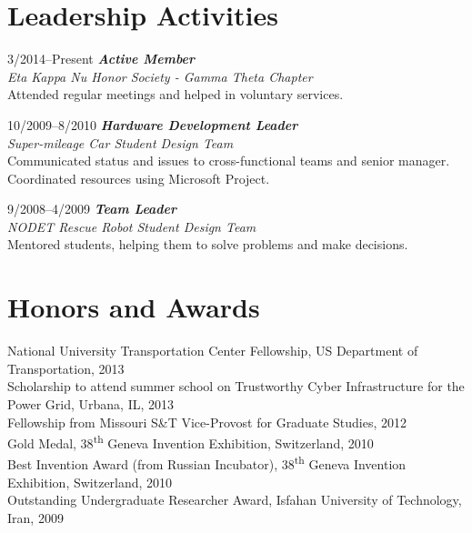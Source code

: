 \documentclass[10pt]{article}
\newlength{\Vspace}
\newlength{\Vspace}
\begin{document}
\section{Leadership Activities}

\begin{CV}

\item[3/2014--Present] \textbf{\textit{Active Member}} \\
    \textit{Eta Kappa Nu Honor Society - Gamma Theta Chapter}\vspace{\Vspace} \\
    Attended regular meetings and helped in voluntary services. \\

\item[10/2009--8/2010] \textbf{\textit{Hardware Development Leader}} \\
    \textit{Super-mileage Car Student Design Team}\vspace{\Vspace} \\
    Communicated status and issues to cross-functional teams and senior manager. \\
    Coordinated resources using Microsoft Project.

\item[9/2008--4/2009] \textbf{\textit{Team Leader}} \\
    \textit{NODET Rescue Robot Student Design Team}\vspace{\Vspace} \\
    Mentored students, helping them to solve problems and make decisions. \\

\end{CV}

\section{Honors and Awards}

\begin{flushleft}

National University Transportation Center Fellowship, US Department of Transportation, 2013 \vspace{\Vspace} \\
Scholarship to attend summer school on Trustworthy Cyber Infrastructure for the Power Grid, Urbana, IL, 2013 \vspace{\Vspace} \\
Fellowship from Missouri S\&T Vice-Provost for Graduate Studies, 2012 \vspace{\Vspace} \\
Gold Medal, 38\textsuperscript{th} Geneva Invention Exhibition, Switzerland, 2010 \vspace{\Vspace} \\
Best Invention Award (from Russian Incubator), 38\textsuperscript{th} Geneva Invention Exhibition, Switzerland, 2010 \vspace{\Vspace} \\
Outstanding Undergraduate Researcher Award, Isfahan University of Technology, Iran, 2009

\end{flushleft}
\end{document}
